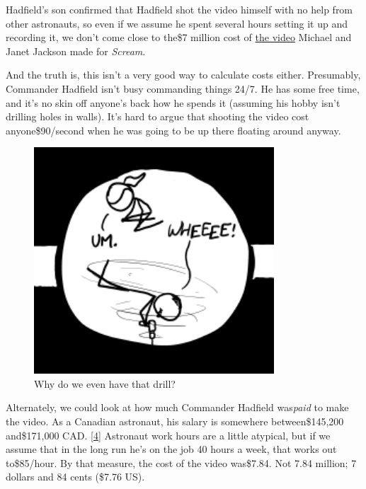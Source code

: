 {{Hadfield’s son confirmed that Hadfield shot the video himself with no help from other astronauts, so even if we assume he spent several hours setting it up and recording it, we don’t come close to the\$7 million cost of \href{http://www.youtube.com/watch?v=0P4A1K4lXDo}{the video} Michael and Janet Jackson made for \emph{Scream}.}

{And the truth is, this isn’t a very good way to calculate costs either. Presumably, Commander Hadfield isn’t busy commanding things 24/7. He has some free time, and it’s no skin off anyone’s back how he spends it (assuming his hobby isn’t drilling holes in walls). It’s hard to argue that shooting the video cost anyone\$90/second when he was going to be up there floating around anyway.}

\begin{figure}[!htbp]
\centering
\includegraphics[scale=0.5, max width=0.8\textwidth]{imgs/a/45/hadfield_holes.png}
\caption{Why do we even have that drill?}
\end{figure}

{Alternately, we could look at how much Commander Hadfield was\emph{paid} to make the video. As a Canadian astronaut, his salary is somewhere between\$145,200 and\$171,000 CAD. \href{http://www.cbc.ca/news/technology/story/2013/05/12/hadfield-iss-returns-earth.html}{[4]} Astronaut work hours are a little atypical, but if we assume that in the long run he’s on the job 40 hours a week, that works out to\$85/hour. By that measure, the cost of the video was\$7.84. Not 7.84 million; 7 dollars and 84 cents (\$7.76 US).}

}
